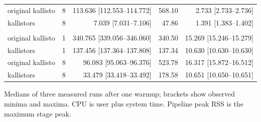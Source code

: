 \begin{longtable}{@{}lrrrr@{}}
original kallisto & 8 & 113.636 [112.553--114.772] & 568.10 & 2.733 [2.733--2.736] \\
kallistors & 8 & 7.039 [7.031--7.106] & 47.86 & 1.391 [1.383--1.402] \\
\addlinespace
\multicolumn{5}{@{}l}{\textit{nascent: SRR10919051}} \\
original kallisto & 1 & 340.765 [339.056--346.060] & 340.50 & 15.269 [15.246--15.279] \\
kallistors & 1 & 137.456 [137.364--137.808] & 137.34 & 10.630 [10.630--10.630] \\
original kallisto & 8 & 96.083 [95.063--96.376] & 523.78 & 16.317 [15.872--16.512] \\
kallistors & 8 & 33.479 [33.418--33.492] & 178.58 & 10.651 [10.650--10.651] \\
\end{longtable}
\noindent\footnotesize Medians of three measured runs after one warmup; brackets show observed minima and maxima. CPU is user plus system time. Pipeline peak RSS is the maximum stage peak.
\endgroup

